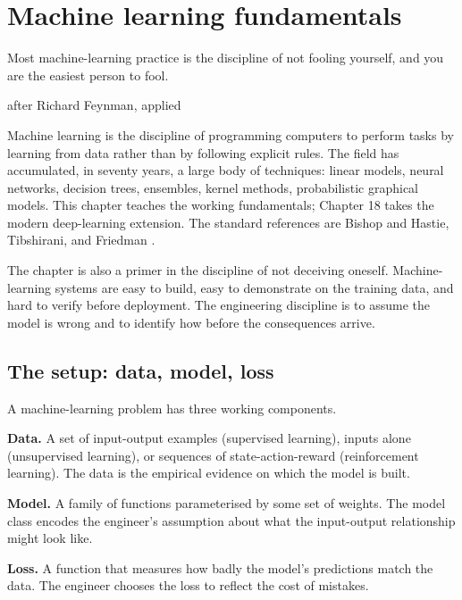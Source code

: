 \chapter{Machine learning fundamentals}
\label{vol07:ch17}

\epigraph{Most machine-learning practice is the discipline of not fooling yourself, and you are the easiest person to fool.}{after Richard Feynman, applied}


\noindent
Machine learning is the discipline of programming computers to perform tasks by learning from data rather than by following explicit rules. The field has accumulated, in seventy years, a large body of techniques: linear models, neural networks, decision trees, ensembles, kernel methods, probabilistic graphical models. This chapter teaches the working fundamentals; Chapter 18 takes the modern deep-learning extension. The standard references are Bishop \cite{text:bishop-prml} and Hastie, Tibshirani, and Friedman \cite{text:hastie-tibshirani-friedman}.

The chapter is also a primer in the discipline of not deceiving oneself. Machine-learning systems are easy to build, easy to demonstrate on the training data, and hard to verify before deployment. The engineering discipline is to assume the model is wrong and to identify how before the consequences arrive.

\section{The setup: data, model, loss}

A machine-learning problem has three working components.

\textbf{Data.} A set of input-output examples (supervised learning), inputs alone (unsupervised learning), or sequences of state-action-reward (reinforcement learning). The data is the empirical evidence on which the model is built.

\textbf{Model.} A family of functions parameterised by some set of weights. The model class encodes the engineer's assumption about what the input-output relationship might look like.

\textbf{Loss.} A function that measures how badly the model's predictions match the data. The engineer chooses the loss to reflect the cost of mistakes.


